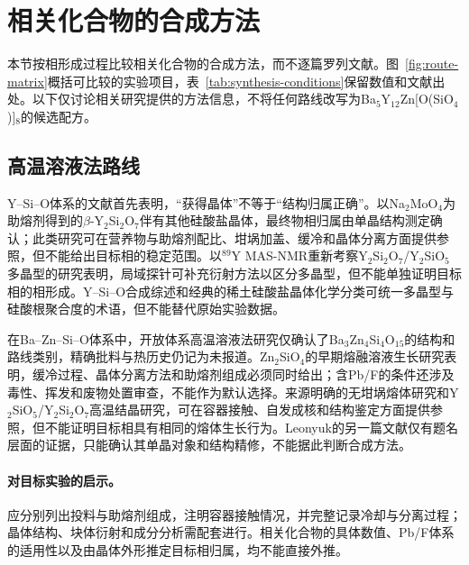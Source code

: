 \section{相关化合物的合成方法}
\label{sec:neighbor-routes}

本节按相形成过程比较相关化合物的合成方法，而不逐篇罗列文献。图~\ref{fig:route-matrix}\CJKecglue{}概括可比较的实验项目，表~\ref{tab:synthesis-conditions}\CJKecglue{}保留数值和文献出处。以下仅讨论相关研究提供的方法信息，不将任何路线改写为Ba$_5$Y$_{12}$Zn[O(SiO$_4$)]$_8$的候选配方。

\subsection{高温溶液法路线}

Y--Si--O体系的文献首先表明，“获得晶体”不等于“结构归属正确”。以Na$_2$MoO$_4$为助熔剂得到的$\beta$-Y$_2$Si$_2$O$_7$伴有其他硅酸盐晶体，最终物相归属由单晶结构测定确认；此类研究可在营养物与助熔剂配比、坩埚加盖、缓冷和晶体分离方面提供参照，但不能给出目标相的稳定范围\cite{redhammer2003beta}。以$^{89}$Y MAS\nobreakdash-NMR重新考察Y$_2$Si$_2$O$_7$\slash Y$_2$SiO$_5$多晶型的研究表明，局域探针可补充衍射方法以区分多晶型，但不能单独证明目标相的相形成\cite{becerro2004revisiting}。Y--Si--O合成综述和经典的稀土硅酸盐晶体化学分类可统一多晶型与硅酸根聚合度的术语，但不能替代原始实验数据\cite{sun2014recent,felsche1973the}。

在Ba--Zn--Si--O体系中，开放体系高温溶液法研究仅确认了Ba$_3$Zn$_4$Si$_4$O$_{15}$的结构和路线类别，精确批料与热历史仍记为未报道\cite{ababaikeri2024ba3zn4si4o15}。Zn$_2$SiO$_4$的早期熔融溶液生长研究表明，缓冷过程、晶体分离方法和助熔剂组成必须同时给出；含Pb\slash F的条件还涉及毒性、挥发和废物处置审查，不能作为默认选择\cite{giess1982zn2sio4}。来源明确的无坩埚熔体研究和Y$_2$SiO$_5$\slash Y$_2$Si$_2$O$_7$高温结晶研究，可在容器接触、自发成核和结构鉴定方面提供参照，但不能证明目标相具有相同的熔体生长行为\cite{christensen1994investigation,leonyuk1999high}。Leonyuk的另一篇文献仅有题名层面的证据，只能确认其单晶对象和结构精修，不能据此判断合成方法\cite{leonyuk1999crystal}。

\paragraph{对目标实验的启示。}应分别列出投料与助熔剂组成，注明容器接触情况，并完整记录冷却与分离过程；晶体结构、块体衍射和成分分析需配套进行。相关化合物的具体数值、Pb\slash F体系的适用性以及由晶体外形推定目标相归属，均不能直接外推。


